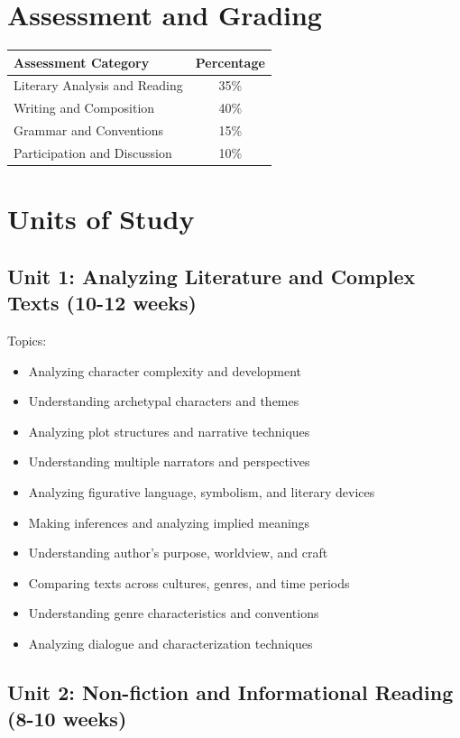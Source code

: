 \documentclass[11pt,letterpaper]{report}
\begin{document}
\section{Assessment and Grading}

\begin{center}
\begin{tabular}{|l|c|}
\hline
\textbf{Assessment Category} & \textbf{Percentage} \\
\hline
Literary Analysis and Reading & 35\% \\
\hline
Writing and Composition & 40\% \\
\hline
Grammar and Conventions & 15\% \\
\hline
Participation and Discussion & 10\% \\
\hline
\end{tabular}
\end{center}

\section{Units of Study}

\subsection{Unit 1: Analyzing Literature and Complex Texts (10-12 weeks)}

Topics:
\begin{itemize}
\item Analyzing character complexity and development
\item Understanding archetypal characters and themes
\item Analyzing plot structures and narrative techniques
\item Understanding multiple narrators and perspectives
\item Analyzing figurative language, symbolism, and literary devices
\item Making inferences and analyzing implied meanings
\item Understanding author's purpose, worldview, and craft
\item Comparing texts across cultures, genres, and time periods
\item Understanding genre characteristics and conventions
\item Analyzing dialogue and characterization techniques
\end{itemize}

\subsection{Unit 2: Non-fiction and Informational Reading (8-10 weeks)}
\end{document}
